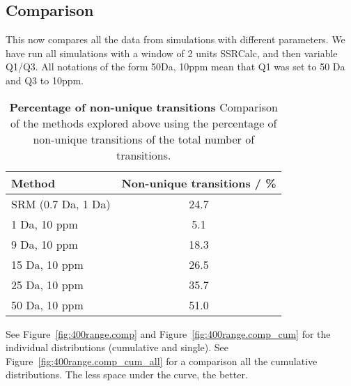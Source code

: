 \clearpage
\subsection{Comparison}

This now compares all the data from simulations with different parameters. We
have run all simulations with a window of 2 units SSRCalc, and then variable
Q1/Q3. All notations of the form 50Da, 10ppm mean that Q1 was set to 50 Da and
Q3 to 10ppm.

\begin{table}[h]

\centering
\caption[]
{\textbf{Percentage of non-unique transitions}
Comparison of the methods explored above using the percentage of non-unique
transitions of the total number of transitions.
}
\label{tab:comp_nonunique}

\begin{tabular}{ l  c }
\maketablespace
Method &Non-unique transitions / \%  \\
\toprule
SRM (0.7 Da, 1 Da) & 24.7 \\
\midrule
1 Da, 10 ppm&  \phantom{1}5.1 \\
9 Da, 10 ppm&  18.3\\
15 Da, 10 ppm& 26.5\\
25 Da, 10 ppm& 35.7\\
50 Da, 10 ppm& 51.0\\

\end{tabular}
\end{table}

See Figure~\ref{fig:400range.comp} and Figure~\ref{fig:400range.comp_cum} for
the individual distributions (cumulative and single). See
Figure~\ref{fig:400range.comp_cum_all} for a comparison all the cumulative
distributions. The less space under the curve, the better.

